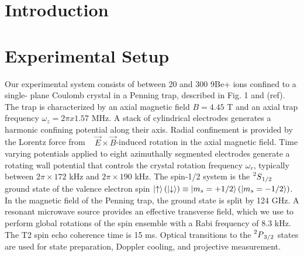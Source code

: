 \documentclass[aps,prl,preprint,groupedaddress]{revtex4-1}
\begin{document}
\section{Introduction}
\section{Experimental Setup}

Our experimental system consists of between 20 and 300 9Be+ ions confined to a single-
plane Coulomb crystal in a Penning trap, described in Fig. 1 and (ref). The trap is characterized by an axial magnetic field $B = 4.45$ T and an axial trap frequency $\omega_z = 2\pi x 1.57$ MHz. A stack of cylindrical electrodes generates a harmonic confining potential along their axis. Radial confinement is provided by the Lorentz force from ~
$\vec{E} \times \vec{B}$-induced rotation in the axial magnetic field. Time varying potentials applied to eight azimuthally segmented electrodes generate a rotating wall potential that controls the crystal rotation frequency $\omega_r$, typically between $2\pi \times 172$ kHz and $2\pi \times 190$ kHz. The spin-1/2 system is the $\prescript{2}{}{S}_{1/2}$ ground state of the valence electron spin $\ket{\uparrow} (\ket{\downarrow}) \equiv \ket{m_{s}=+1/2} (\ket{m_{s}=-1/2}) $. In the magnetic field of the Penning trap, the ground state is split by 124 GHz. A resonant microwave source provides an effective transverse field, which we use to perform global rotations of the spin ensemble with a Rabi frequency of 8.3 kHz. The T2 spin echo coherence time is 15 ms. Optical transitions to the $\prescript{2}{}{P}_{3/2}$ states are used for state preparation, Doppler cooling, and projective measurement. 
\end{document}

